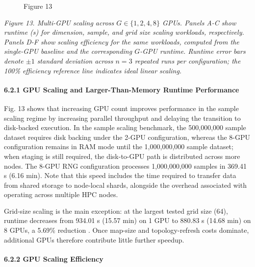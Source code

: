 \documentclass[
]{article}
\makeatletter
\newcommand*\pandocbounded[1]{%
  \sbox\pandoc@box{#1}%
  \Gscale@div\@tempa{\textheight}{\dimexpr\ht\pandoc@box+\dp\pandoc@box\relax}%
  \Gscale@div\@tempb{\linewidth}{\wd\pandoc@box}%
  \ifdim\@tempb\p@<\@tempa\p@\let\@tempa\@tempb\fi%
  \ifdim\@tempa\p@<\p@\scalebox{\@tempa}{\usebox\pandoc@box}%
  \else\usebox{\pandoc@box}%
  \fi%
}
\providecommand{\DIFadd}[1]{{\protect\color{blue} #1}} %
\providecommand{\DIFaddbegin}{} %
\providecommand{\DIFaddend}{} %
\providecommand{\DIFaddFL}[1]{\DIFadd{#1}} %
\providecommand{\DIFaddbeginFL}{} %
\providecommand{\DIFaddendFL}{} %
\makeatother
\begin{document}
\begin{figure}
\centering
 \DIFaddbeginFL \pandocbounded{}
\DIFaddendFL \caption{Figure  \DIFaddbeginFL \DIFaddFL{13}\DIFaddendFL }
\end{figure}

\emph{Figure  \DIFaddbegin \DIFadd{13. }\DIFaddend Multi-GPU scaling across \(G\in\{1,2,4,8\}\) GPUs.
Panels A-C show runtime (s) for dimension, sample, and grid size scaling
workloads, respectively. Panels D-F show scaling efficiency for the same
workloads, computed from the single-GPU baseline and the corresponding
\(G\)-GPU runtime. Runtime error bars denote \(\pm 1\) standard
deviation across \(n=3\) repeated runs per configuration; the 100\%
efficiency reference line indicates ideal linear scaling.}

\paragraph{6.2.1 GPU Scaling and Larger-Than-Memory Runtime
Performance}\label{gpu-scaling-and-larger-than-memory-runtime-performance}

Fig.  \DIFaddbegin \DIFadd{13 }\DIFaddend shows that increasing GPU count improves performance in the
sample scaling regime by increasing parallel throughput and delaying the
transition to disk-backed execution. In the sample scaling benchmark,
the 500,000,000 sample dataset requires disk backing under the 2-GPU
configuration, whereas the 8-GPU configuration remains in RAM mode until
the 1,000,000,000 sample dataset; when staging is still required, the
disk-to-GPU path is distributed across more nodes. The 8-GPU RNG
configuration processes 1,000,000,000 samples in 369.41 s (6.16 min).
Note that this speed includes the time required to transfer data from
shared storage to node-local shards, alongside the overhead associated
with operating across multiple HPC nodes.

 \DIFaddbegin \DIFadd{Grid-size scaling is }\DIFaddend the main exception: at the largest tested grid size
(64), runtime  \DIFaddbegin \DIFadd{decreases }\DIFaddend from 934.01 s (15.57 min) on 1 GPU to  880.83 s
(14.68 min) on 8 GPUs, a 5.69\% reduction \DIFaddbegin \DIFadd{. Once }\DIFaddend map-size  \DIFaddbegin \DIFadd{and
}\DIFaddend topology-refresh costs dominate, additional GPUs  \DIFaddbegin \DIFadd{therefore contribute
little further }\DIFaddend speedup.

\paragraph{6.2.2 GPU Scaling Efficiency}\label{gpu-scaling-efficiency}
\end{document}
